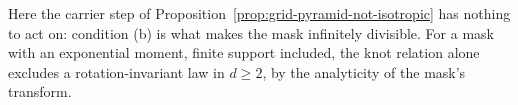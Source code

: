 Here the carrier step of Proposition~\ref{prop:grid-pyramid-not-isotropic} has nothing to act on:
condition (b) is what makes the mask infinitely divisible.
For a mask with an exponential moment, finite support included, the knot
relation alone excludes a rotation-invariant law in $d \ge 2$, by the analyticity of the mask's
transform.

